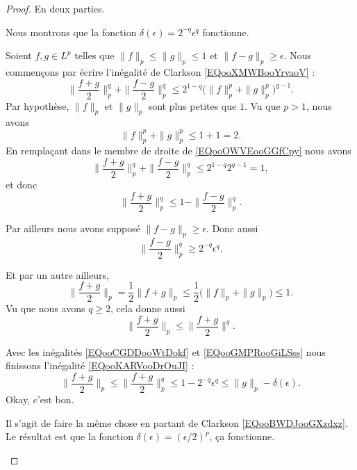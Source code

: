 \begin{proof}
	En deux parties.

	\begin{subproof}
		\spitem[\( 1<p\leq 2\)]
		Nous montrons que la fonction \( \delta(\epsilon)=2^{-q}\epsilon^q\) fonctionne.

		Soient \( f,g\in L^p\) telles que \( \| f \|_p\leq \| g \|_p\leq 1\) et \( \| f-g \|_p\geq \epsilon\). Nous commençons par écrire l'inégalité de Clarkson \eqref{EQooXMWBooYrvaoV} :
		\begin{equation}        \label{EQooOWVEooGGfCpy}
			\| \frac{ f+g }{2} \|_p^q+\| \frac{ f-g }{2} \|_p^q\leq 2^{1-q}\big( \| f \|_p^p+\| g \|_p^p \big)^{q-1}.
		\end{equation}
		Par hypothèse, \( \| f \|_p\) et \( \| g \|_p\) sont plus petites que \( 1\). Vu que \( p>1\), nous avons
		\begin{equation}
			\| f \|_p^p+\| g \|_p^p\leq 1+1=2.
		\end{equation}
		En remplaçant dans le membre de droite de \eqref{EQooOWVEooGGfCpy} nous avons
		\begin{equation}
			\| \frac{ f+g }{2} \|_p^q+\| \frac{ f-g }{2} \|_p^q\leq 2^{1-q}2^{q-1}=1,
		\end{equation}
		et donc
		\begin{equation}        \label{EQooKARVooDrOuJI}
			\| \frac{ f+g }{2} \|_p^q\leq 1-\| \frac{ f-g }{2} \|_p^q.
		\end{equation}

		Par ailleurs nous avons supposé \( \| f-g \|_p\geq \epsilon\). Donc aussi
		\begin{equation}        \label{EQooCGDDooWtDokf}
			\| \frac{ f-g }{2} \|_p^q\geq 2^{-q}\epsilon^q.
		\end{equation}

		Et par un autre ailleurs,
		\begin{equation}        \label{EQooOFWYooLVrNDc}
			\| \frac{ f+g }{2} \|_p=\frac{ 1 }{2}\| f+g \|_p\leq \frac{ 1 }{2}\big( \| f \|_p+\| g \|_p \big)\leq 1.
		\end{equation}
		Vu que nous avons \( q\geq 2\), cela donne aussi
		\begin{equation}        \label{EQooGMPRooGiLSss}
			\| \frac{ f+g }{2} \|_p\leq \| \frac{ f+g }{2} \|^q.
		\end{equation}

		Avec les inégalités \eqref{EQooCGDDooWtDokf} et \ref{EQooGMPRooGiLSss} nous finissons l'inégalité \eqref{EQooKARVooDrOuJI} :
		\begin{equation}
			\| \frac{ f+g }{2} \|_p\leq \| \frac{ f+g }{2} \|_p^q\leq 1-2^{-q}\epsilon^q\leq \| g \|_p-\delta(\epsilon).
		\end{equation}
		Okay, c'est bon.

		Il s'agit de faire la même chose en partant de Clarkson \eqref{EQooBWDJooGXzdxz}. Le résultat est que la fonction \( \delta(\epsilon)=(\epsilon/2)^p\), ça fonctionne.
	\end{subproof}
\end{proof}

